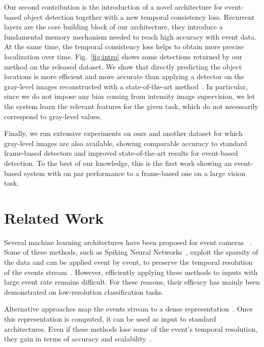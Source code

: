 \documentclass{article}
\begin{document}
Our second contribution is the introduction of a novel architecture for 
event-based object detection together with a new temporal consistency loss.
Recurrent layers are the core building block of our architecture, they introduce a fundamental memory mechanism 
needed to reach high accuracy with event data. At the same time, the temporal consistency loss helps to obtain more precise localization over time.
Fig.~\ref{fig:intro} shows some detections returned by our method on the released dataset.
We show that directly predicting the object locations is more efficient and more accurate than applying a detector on the gray-level images reconstructed with a state-of-the-art method~\cite{rebecq2019high}.
In particular, since we do not impose any bias coming from intensity image supervision,
we let the system learn the relevant features for the given task, which do not necessarily correspond to gray-level values.


Finally, we run extensive experiments on ours and another dataset 
for which gray-level images are also available, showing 
comparable accuracy to standard frame-based detectors and improved state-of-the-art results for event-based detection.
To the best of our knowledge, 
this is the first work showing an event-based system with on par 
performance to a frame-based one on a large vision task.
 
\section{Related Work}
\label{sec:related_work}
\vspace{-2mm}
Several machine learning architectures have been proposed for event cameras ~\cite{wang2019space,sekikawa2019eventnet,messikommer2020event}.
Some of these methods, such as Spiking Neural Networks~\cite{kasabov2013dynamic,lee2016training,shrestha2018slayer,tavanaei2019deep}, exploit the sparsity of the data and can be applied event by event, to preserve the temporal resolution of the events stream~\cite{lee2016training,cannici2019asynchronous,sironi2018hats,neil2016phased}. 
However, efficiently applying these methods to inputs with large event rate remains difficult. For these reasons, their efficacy has mainly been demonstrated on low-resolution classification tasks.




Alternative approaches map the events stream 
to a dense representation~\cite{alonso2019ev,maqueda2018event,zhu2019unsupervised,rebecq2019high}.
Once this representation is computed, 
it can be used as input to standard architectures.
Even if these methods lose some of the event's 
temporal resolution, they gain in terms of accuracy and scalability~\cite{zhu2018ev,maqueda2018event}.
\end{document}
